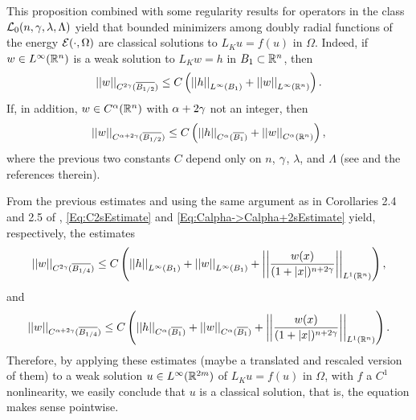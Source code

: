 \begin{remark}
	\label{Remark:InteriorRegularity}
	This proposition combined with some regularity results for operators in the class $\mathcal{L}_0(n,\gamma,\lambda, \Lambda)$ yield that bounded minimizers among doubly radial functions of the energy $\mathcal{E}(\cdot,\Omega)$ are classical solutions to $L_K u = f(u)$ in $\Omega$. Indeed, if $w\in L^\infty (\mathbb{R}^n)$ is a weak solution to $L_K w = h$ in $B_1\subset \mathbb{R}^n$, then
	\begin{equation}
	\label{Eq:C2sEstimate}
	\left | \left |{w} \right | \right |_{C^{2\gamma} (\overline{B_{1/2}})} \leq C\left ( {\left | \left |{h} \right | \right |_{L^\infty (B_1)} + \left | \left |{w} \right | \right |_{L^\infty  (\mathbb{R}^n)}}\right ).
	\end{equation} 
	If, in addition, $w \in C^\alpha (\mathbb{R}^n)$ with $\alpha + 2\gamma$ not an integer, then
	\begin{equation}
	\label{Eq:Calpha->Calpha+2sEstimate}
	\left | \left |{w} \right | \right |_{C^{\alpha + 2\gamma} (\overline{B_{1/2}})} \leq C\left ( {\left | \left |{h} \right | \right |_{C^{\alpha} (\overline{B_1})} + \left | \left |{w} \right | \right |_{C^\alpha (\mathbb{R}^n)} }\right ),
	\end{equation}
	where the previous two constants $C$ depend only on $n$, $\gamma$, $\lambda$, and $\Lambda$ (see \cite{RosOton-Survey,SerraC2s+alphaRegularity} and the references therein).
	
	From the previous estimates and using the same argument as in Corollaries 2.4 and 2.5 of \cite{RosOtonSerra-Regularity}, \eqref{Eq:C2sEstimate} and \eqref{Eq:Calpha->Calpha+2sEstimate} yield, respectively, the estimates
	\begin{equation}
	\label{Eq:C2sEstimateBalls}
	\left | \left |{w} \right | \right |_{C^{2\gamma} (\overline{B_{1/4}})} \leq C\left ( {\left | \left |{h} \right | \right |_{L^\infty (B_1)} + \left | \left |{w} \right | \right |_{L^\infty  (B_1)} + \left | \left |{\dfrac{w(x)}{(1+|x|)^{n+2\gamma}}} \right | \right |_{L^1(\mathbb{R}^n)} }\right ),
	\end{equation}
	and 
	\begin{equation}
	\label{Eq:Calpha->Calpha+2sEstimateBalls}
	\left | \left |{w} \right | \right |_{C^{\alpha + 2\gamma} (\overline{B_{1/4}})} \leq C\left ( {\left | \left |{h} \right | \right |_{C^{\alpha} (\overline{B_1})} + \left | \left |{w} \right | \right |_{C^\alpha (\overline{B_1})} + \left | \left |{\dfrac{w(x)}{(1+|x|)^{n+2\gamma}}} \right | \right |_{L^1(\mathbb{R}^n)} }\right ).
	\end{equation}
	Therefore, by applying these estimates (maybe a translated and rescaled version of them) to a weak solution $u\in L^\infty(\mathbb{R}^{2m})$ of $L_K u = f(u)$ in $\Omega$, with $f$ a $C^1$ nonlinearity, we easily conclude that $u$ is a classical solution, that is, the equation makes sense pointwise.
\end{remark}




